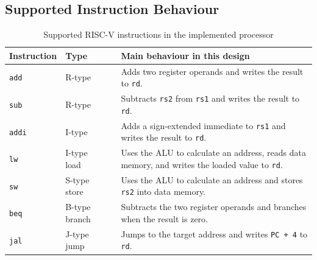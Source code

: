 \documentclass[12pt,a4paper]{article}
\begin{document}
\subsection{Supported Instruction Behaviour}
\begin{table}[h!]
\centering
\caption{Supported RISC-V instructions in the implemented processor}
\label{tab:supported-instructions}
\begin{tabularx}{\textwidth}{lllX}
\toprule
\textbf{Instruction} & \textbf{Type} & \textbf{} & \textbf{Main behaviour in this design} \\
\midrule
\texttt{add}  & R-type & & Adds two register operands and writes the result to \texttt{rd}. \\

\texttt{sub}  & R-type & & Subtracts \texttt{rs2} from \texttt{rs1} and writes the result to \texttt{rd}. \\

\texttt{addi} & I-type & & Adds a sign-extended immediate to \texttt{rs1} and writes the result to \texttt{rd}. \\

\texttt{lw}   & I-type load & & Uses the ALU to calculate an address, reads data memory, and writes the loaded value to \texttt{rd}. \\

\texttt{sw}   & S-type store & & Uses the ALU to calculate an address and stores \texttt{rs2} into data memory. \\

\texttt{beq}  & B-type branch & & Subtracts the two register operands and branches when the result is zero. \\

\texttt{jal}  & J-type jump & & Jumps to the target address and writes \texttt{PC + 4} to \texttt{rd}. \\
\bottomrule
\end{tabularx}
\end{table}
\end{document}
